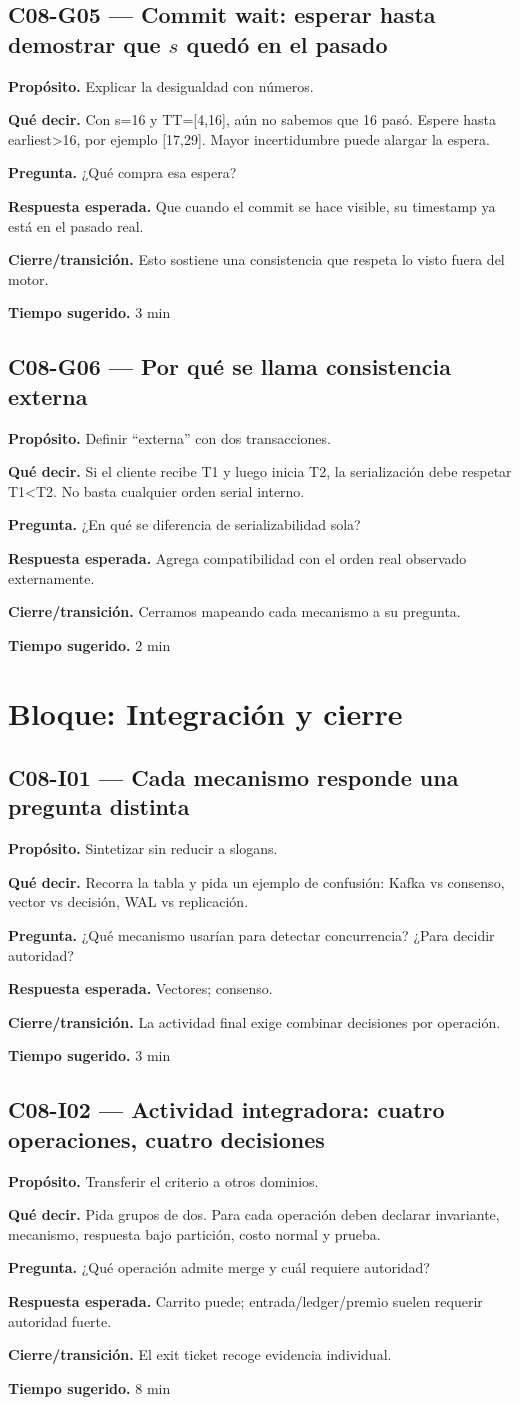 \documentclass[variant=docente,cover=institutional,mode=screen]{ua-engineering-v6-article}
\newcommand{\FrameField}[2]{\par\noindent\textbf{#1.} #2\par}
\begin{document}
\subsection*{C08-G05 --- Commit wait: esperar hasta demostrar que $s$ quedó en el pasado}
\FrameField{Propósito}{Explicar la desigualdad con números.}
\FrameField{Qué decir}{Con s=16 y TT=[4,16], aún no sabemos que 16 pasó. Espere hasta earliest>16, por ejemplo [17,29]. Mayor incertidumbre puede alargar la espera.}
\FrameField{Pregunta}{¿Qué compra esa espera?}
\FrameField{Respuesta esperada}{Que cuando el commit se hace visible, su timestamp ya está en el pasado real.}
\FrameField{Cierre/transición}{Esto sostiene una consistencia que respeta lo visto fuera del motor.}
\FrameField{Tiempo sugerido}{3 min}

\subsection*{C08-G06 --- Por qué se llama consistencia externa}
\FrameField{Propósito}{Definir “externa” con dos transacciones.}
\FrameField{Qué decir}{Si el cliente recibe T1 y luego inicia T2, la serialización debe respetar T1<T2. No basta cualquier orden serial interno.}
\FrameField{Pregunta}{¿En qué se diferencia de serializabilidad sola?}
\FrameField{Respuesta esperada}{Agrega compatibilidad con el orden real observado externamente.}
\FrameField{Cierre/transición}{Cerramos mapeando cada mecanismo a su pregunta.}
\FrameField{Tiempo sugerido}{2 min}

\section{Bloque: Integración y cierre}

\subsection*{C08-I01 --- Cada mecanismo responde una pregunta distinta}
\FrameField{Propósito}{Sintetizar sin reducir a slogans.}
\FrameField{Qué decir}{Recorra la tabla y pida un ejemplo de confusión: Kafka vs consenso, vector vs decisión, WAL vs replicación.}
\FrameField{Pregunta}{¿Qué mecanismo usarían para detectar concurrencia? ¿Para decidir autoridad?}
\FrameField{Respuesta esperada}{Vectores; consenso.}
\FrameField{Cierre/transición}{La actividad final exige combinar decisiones por operación.}
\FrameField{Tiempo sugerido}{3 min}

\subsection*{C08-I02 --- Actividad integradora: cuatro operaciones, cuatro decisiones}
\FrameField{Propósito}{Transferir el criterio a otros dominios.}
\FrameField{Qué decir}{Pida grupos de dos. Para cada operación deben declarar invariante, mecanismo, respuesta bajo partición, costo normal y prueba.}
\FrameField{Pregunta}{¿Qué operación admite merge y cuál requiere autoridad?}
\FrameField{Respuesta esperada}{Carrito puede; entrada/ledger/premio suelen requerir autoridad fuerte.}
\FrameField{Cierre/transición}{El exit ticket recoge evidencia individual.}
\FrameField{Tiempo sugerido}{8 min}
\end{document}
